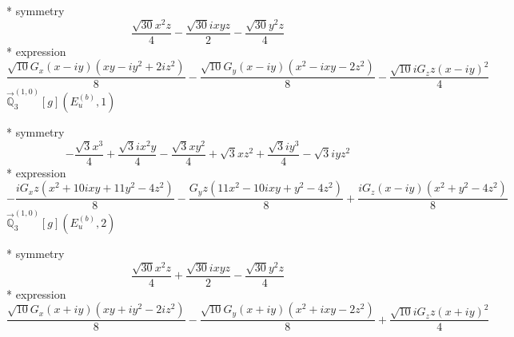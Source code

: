 \documentclass[fleqn,8pt]{jsarticle}
\begin{document}
\noindent\quad ** symmetry
\begin{dmath*}
\frac{\sqrt{30} x^{2} z}{4} - \frac{\sqrt{30} i x y z}{2} - \frac{\sqrt{30} y^{2} z}{4}
\end{dmath*}
\noindent\quad ** expression
\begin{dmath*}
\frac{\sqrt{10} G_{x} \left(x - i y\right) \left(x y - i y^{2} + 2 i z^{2}\right)}{8} - \frac{\sqrt{10} G_{y} \left(x - i y\right) \left(x^{2} - i x y - 2 z^{2}\right)}{8} - \frac{\sqrt{10} i G_{z} z \left(x - i y\right)^{2}}{4}
\end{dmath*}
\noindent\quad $\vec{\mathbb{Q}}_{3}^{(1,0)}[g](E_{u}^{(b)},1)$

\noindent\quad ** symmetry
\begin{dmath*}
- \frac{\sqrt{3} x^{3}}{4} + \frac{\sqrt{3} i x^{2} y}{4} - \frac{\sqrt{3} x y^{2}}{4} + \sqrt{3} x z^{2} + \frac{\sqrt{3} i y^{3}}{4} - \sqrt{3} i y z^{2}
\end{dmath*}
\noindent\quad ** expression
\begin{dmath*}
- \frac{i G_{x} z \left(x^{2} + 10 i x y + 11 y^{2} - 4 z^{2}\right)}{8} - \frac{G_{y} z \left(11 x^{2} - 10 i x y + y^{2} - 4 z^{2}\right)}{8} + \frac{i G_{z} \left(x - i y\right) \left(x^{2} + y^{2} - 4 z^{2}\right)}{8}
\end{dmath*}
\noindent\quad $\vec{\mathbb{Q}}_{3}^{(1,0)}[g](E_{u}^{(b)},2)$

\noindent\quad ** symmetry
\begin{dmath*}
\frac{\sqrt{30} x^{2} z}{4} + \frac{\sqrt{30} i x y z}{2} - \frac{\sqrt{30} y^{2} z}{4}
\end{dmath*}
\noindent\quad ** expression
\begin{dmath*}
\frac{\sqrt{10} G_{x} \left(x + i y\right) \left(x y + i y^{2} - 2 i z^{2}\right)}{8} - \frac{\sqrt{10} G_{y} \left(x + i y\right) \left(x^{2} + i x y - 2 z^{2}\right)}{8} + \frac{\sqrt{10} i G_{z} z \left(x + i y\right)^{2}}{4}
\end{dmath*}
\end{document}
